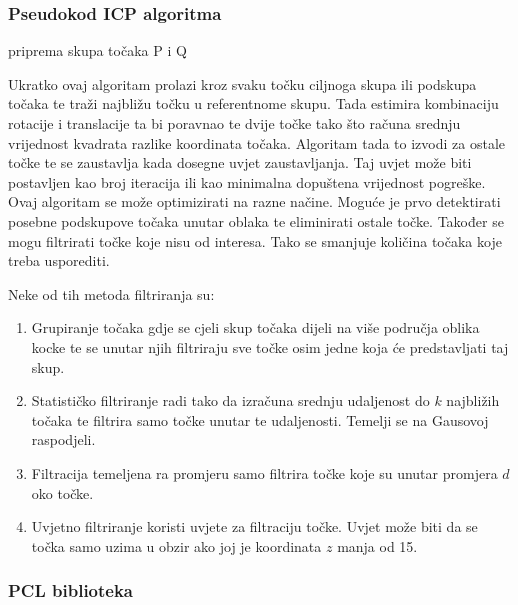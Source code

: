 \subsubsection{Pseudokod ICP algoritma}
\begin{algorithm}[H]
\SetAlgoLined
{}
 priprema skupa točaka P i Q\;
\end{algorithm}
Ukratko ovaj algoritam prolazi kroz svaku točku ciljnoga skupa ili podskupa točaka te traži najbližu točku u referentnome skupu. Tada estimira kombinaciju rotacije i translacije ta bi poravnao te dvije točke tako što računa srednju vrijednost kvadrata razlike koordinata točaka. Algoritam tada to izvodi za ostale točke te se zaustavlja kada dosegne uvjet zaustavljanja. Taj uvjet može biti postavljen kao broj iteracija ili kao minimalna dopuštena vrijednost pogreške. Ovaj algoritam se može optimizirati na razne načine. Moguće je prvo detektirati posebne podskupove točaka unutar oblaka te eliminirati ostale točke. Također se mogu filtrirati točke koje nisu od interesa. Tako se smanjuje količina točaka koje treba usporediti.

Neke od tih metoda filtriranja su:
\begin{enumerate}
  \item Grupiranje točaka gdje se cjeli skup točaka dijeli na više područja oblika kocke te se unutar njih filtriraju sve točke osim jedne koja će predstavljati taj skup.
  \item Statističko filtriranje radi tako da izračuna srednju udaljenost do $k$ najbližih točaka te filtrira samo točke unutar te udaljenosti. Temelji se na Gausovoj raspodjeli.
  \item Filtracija temeljena ra promjeru samo filtrira točke koje su unutar promjera $d$ oko točke.
  \item Uvjetno filtriranje koristi uvjete za filtraciju točke. Uvjet može biti da se točka samo uzima u obzir ako joj je koordinata $z$ manja od 15.
\end{enumerate}

\pagebreak
\subsubsection{PCL biblioteka}

